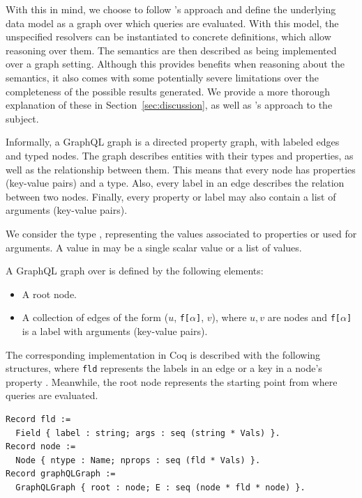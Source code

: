 With this in mind, we choose to follow \HP{}'s approach and define the underlying data model as a graph over which queries are evaluated. With this model, the unspecified resolvers can be instantiated to concrete definitions, which allow reasoning over them. The semantics are then described as being implemented over a graph setting. Although this provides benefits when reasoning about the semantics, it also comes with some potentially severe limitations over the completeness of the possible results generated. We provide a more thorough explanation of these in Section~\ref{sec:discussion}, as well as \HP{}'s approach to the subject.

Informally, a GraphQL graph is a directed property graph, with labeled edges and typed nodes. The graph describes entities with their types and properties, as well as the relationship between them. This means that every node has properties (key-value pairs) and a type. Also, every label in an edge describes the relation between two nodes. Finally, every property or label may also contain a list of arguments (key-value pairs).

We consider the type \Vals, representing the values associated to properties or used for arguments. A value in \Vals{} may be a single scalar value or a list of values.

\begin{definition}
A GraphQL graph over \Vals{} is defined by the following elements:
\begin{itemize}
    \item A root node.
    \item A collection of edges of the form ($u$, \texttt{f[}$\alpha$\texttt{]}, $v$), where $u, v$ are nodes and \texttt{f[}$\alpha$\texttt{]} is a label with arguments (key-value pairs).
\end{itemize}
\end{definition}

The corresponding implementation in Coq is described with the following structures, where \texttt{fld} represents the labels in an edge or a key in a node's property . 
Meanwhile, the root node represents the starting point from where queries are evaluated.

\begin{verbatim}
Record fld := 
  Field { label : string; args : seq (string * Vals) }.
Record node := 
  Node { ntype : Name; nprops : seq (fld * Vals) }.
Record graphQLGraph := 
  GraphQLGraph { root : node; E : seq (node * fld * node) }.
\end{verbatim}


